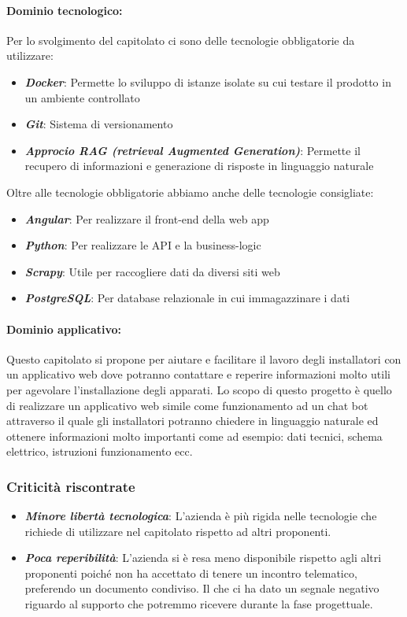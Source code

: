 \paragraph{Dominio tecnologico:}
Per lo svolgimento del capitolato ci sono delle tecnologie obbligatorie da utilizzare:
\begin{itemize}
    \item \textit{\textbf{Docker}}: Permette lo sviluppo di istanze isolate su cui testare il prodotto in un ambiente controllato
    \item \textit{\textbf{Git}}: Sistema di versionamento
    \item \textit{\textbf{Approcio RAG (retrieval Augmented Generation)}}: Permette il recupero di informazioni e generazione di risposte in linguaggio naturale
\end{itemize}
Oltre alle tecnologie obbligatorie abbiamo anche delle tecnologie consigliate:
\begin{itemize}
    \item \textit{\textbf{Angular}}:  Per realizzare il front-end della web app
    \item \textit{\textbf{Python}}:  Per realizzare le API e la business-logic
    \item \textit{\textbf{Scrapy}}: Utile per raccogliere dati da diversi siti web
    \item \textit{\textbf{PostgreSQL}}: Per database relazionale in cui immagazzinare i dati 
\end{itemize}
\paragraph{Dominio applicativo:}
Questo capitolato si propone per aiutare e facilitare il lavoro degli installatori 
con un applicativo web dove potranno contattare e reperire informazioni molto utili 
per agevolare l’installazione degli apparati.
Lo scopo di questo progetto è quello di realizzare un applicativo web simile come 
funzionamento ad un chat bot attraverso il quale gli installatori potranno chiedere 
in linguaggio naturale ed ottenere informazioni molto importanti come ad esempio: 
dati tecnici, schema elettrico, istruzioni funzionamento ecc.
  
\subsubsection{Criticità riscontrate}
\begin{itemize}
    \item \textit{\textbf{Minore libertà tecnologica}}:  L’azienda è più rigida nelle tecnologie che richiede di utilizzare nel capitolato rispetto ad altri proponenti.
    \item \textit{\textbf{Poca reperibilità}}:  L’azienda si è resa meno disponibile rispetto agli altri proponenti poiché non ha accettato di tenere un incontro telematico, preferendo un documento condiviso. Il che ci ha dato un segnale negativo riguardo al supporto che potremmo ricevere durante la fase progettuale.
\end{itemize}

